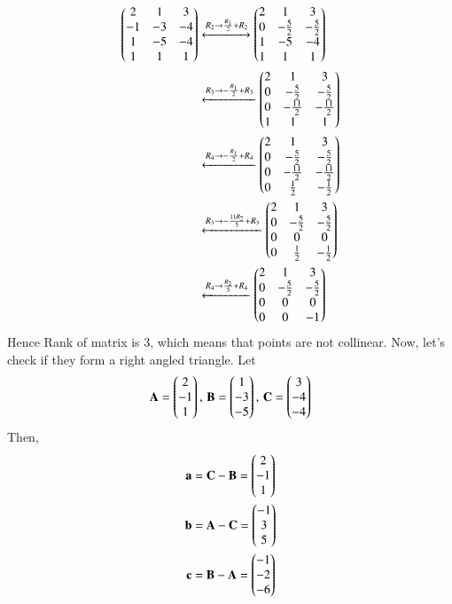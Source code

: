 \documentclass[journal,12pt,twocolumn]{IEEEtran}
\let\vec\mathbf
\begin{document}
\begin{enumerate}[start=17]
\begin{align}
 \begin{pmatrix}2&1&3\\-1&-3&-4\\1&-5&-4\\1&1&1\end{pmatrix} &\xleftrightarrow[]{R_2\rightarrow \frac{R_1}{2}+R_2} \begin{pmatrix}2&1&3\\0&-\frac{5}{2}&-\frac{5}{2}\\1&-5&-4\\1&1&1\end{pmatrix}\\
 &\xleftarrow[]{R_3\rightarrow -\frac{R_1}{2} + R_3} \begin{pmatrix}2&1&3\\0&-\frac{5}{2}&-\frac{5}{2}\\0&-\frac{11}{2}&-\frac{11}{2}\\1&1&1\end{pmatrix} \\
 &\xleftarrow[]{R_4\rightarrow -\frac{R_1}{2} + R_4} \begin{pmatrix}2&1&3\\0&-\frac{5}{2}&-\frac{5}{2}\\0&-\frac{11}{2}&-\frac{11}{2}\\0&\frac{1}{2}&-\frac{1}{2}\end{pmatrix} \\
 &\xleftarrow[]{R_3\rightarrow -\frac{11R_2}{5} + R_3} \begin{pmatrix}2&1&3\\0&-\frac{5}{2}&-\frac{5}{2}\\0&0&0\\0&\frac{1}{2}&-\frac{1}{2}\end{pmatrix} \\
 &\xleftarrow[]{R_4\rightarrow \frac{R_2}{5} + R_4} \begin{pmatrix}2&1&3\\0&-\frac{5}{2}&-\frac{5}{2}\\0&0&0\\0&0&-1\end{pmatrix} 
\end{align}
Hence Rank of matrix is 3, which means that points are not collinear. Now, let's check if they form a right angled triangle. 
Let 
\begin{align}
\vec{A} = \myvec{2\\-1\\1},\, \vec{B} = \myvec{1\\-3\\-5},\,\vec{C} = \myvec{3\\-4\\-4}
\end{align}
Then,
\begin{align}
 \vec{a} &= \vec{C} - \vec{B} = \myvec{2\\-1\\1}\\
 \vec{b} &= \vec{A} - \vec{C} = \myvec{-1\\3\\5}\\
 \vec{c} &= \vec{B} - \vec{A} = \myvec{-1\\-2\\-6}
\end{align}


\end{enumerate}
\end{document}
